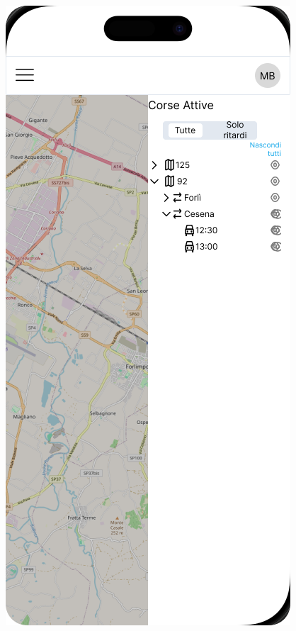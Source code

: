 \begin{figure}[H]
  \centering
  \begin{minipage}[b]{0.25\textwidth}
    \centering
    \includegraphics[width=\textwidth]{images/mockup/Mappa Linee.png}

\end{minipage}
\end{figure}
